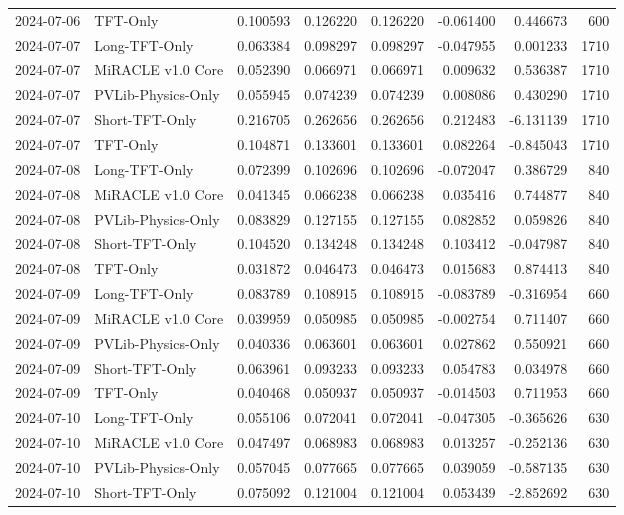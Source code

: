 \begin{tabular}{llrrrrrr}
2024-07-06 & TFT-Only & 0.100593 & 0.126220 & 0.126220 & -0.061400 & 0.446673 & 600 \\
2024-07-07 & Long-TFT-Only & 0.063384 & 0.098297 & 0.098297 & -0.047955 & 0.001233 & 1710 \\
2024-07-07 & MiRACLE v1.0 Core & 0.052390 & 0.066971 & 0.066971 & 0.009632 & 0.536387 & 1710 \\
2024-07-07 & PVLib-Physics-Only & 0.055945 & 0.074239 & 0.074239 & 0.008086 & 0.430290 & 1710 \\
2024-07-07 & Short-TFT-Only & 0.216705 & 0.262656 & 0.262656 & 0.212483 & -6.131139 & 1710 \\
2024-07-07 & TFT-Only & 0.104871 & 0.133601 & 0.133601 & 0.082264 & -0.845043 & 1710 \\
2024-07-08 & Long-TFT-Only & 0.072399 & 0.102696 & 0.102696 & -0.072047 & 0.386729 & 840 \\
2024-07-08 & MiRACLE v1.0 Core & 0.041345 & 0.066238 & 0.066238 & 0.035416 & 0.744877 & 840 \\
2024-07-08 & PVLib-Physics-Only & 0.083829 & 0.127155 & 0.127155 & 0.082852 & 0.059826 & 840 \\
2024-07-08 & Short-TFT-Only & 0.104520 & 0.134248 & 0.134248 & 0.103412 & -0.047987 & 840 \\
2024-07-08 & TFT-Only & 0.031872 & 0.046473 & 0.046473 & 0.015683 & 0.874413 & 840 \\
2024-07-09 & Long-TFT-Only & 0.083789 & 0.108915 & 0.108915 & -0.083789 & -0.316954 & 660 \\
2024-07-09 & MiRACLE v1.0 Core & 0.039959 & 0.050985 & 0.050985 & -0.002754 & 0.711407 & 660 \\
2024-07-09 & PVLib-Physics-Only & 0.040336 & 0.063601 & 0.063601 & 0.027862 & 0.550921 & 660 \\
2024-07-09 & Short-TFT-Only & 0.063961 & 0.093233 & 0.093233 & 0.054783 & 0.034978 & 660 \\
2024-07-09 & TFT-Only & 0.040468 & 0.050937 & 0.050937 & -0.014503 & 0.711953 & 660 \\
2024-07-10 & Long-TFT-Only & 0.055106 & 0.072041 & 0.072041 & -0.047305 & -0.365626 & 630 \\
2024-07-10 & MiRACLE v1.0 Core & 0.047497 & 0.068983 & 0.068983 & 0.013257 & -0.252136 & 630 \\
2024-07-10 & PVLib-Physics-Only & 0.057045 & 0.077665 & 0.077665 & 0.039059 & -0.587135 & 630 \\
2024-07-10 & Short-TFT-Only & 0.075092 & 0.121004 & 0.121004 & 0.053439 & -2.852692 & 630 \\

\end{tabular}
